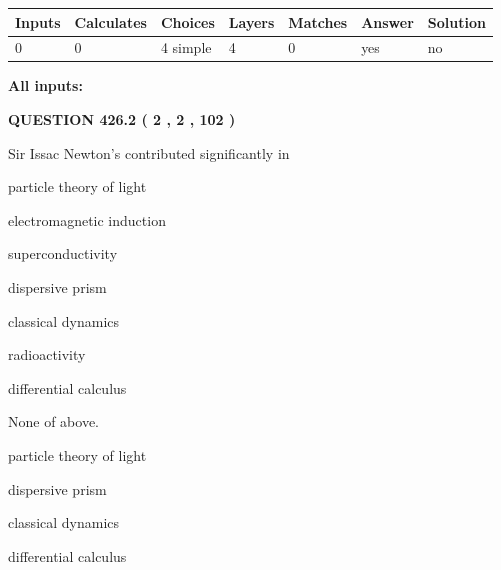 \documentclass[12pt]{article}
\begin{document}
 
   
   
   
   
\noindent\begin{tabular}{|l|l|l|l|l|l|l|}
 \hline
Inputs & Calculates & Choices & Layers & Matches & Answer & Solution \\ \hline
 0  & 
 0  & 
 4
  simple  
  & 
 4  & 
 0  & 
  yes & 
  no 
  \\ \hline
 \end{tabular}
   
   
   
   
\noindent{}
   
   
   
   
\noindent\vspace{0.1in}\hspace{-0.08in} {\textbf{\Large{All inputs: }}}
   
   
  
\vspace{0.2in}
  
{\textbf{\Large{QUESTION
426.2 
 ( 2 , 2 , 102 )
}}}
  
  
Sir Issac Newton's contributed significantly in
 
 
particle theory of light
 
 
electromagnetic induction
 
 
superconductivity
 
 
dispersive prism
 
 
classical dynamics
 
 
radioactivity
 
 
differential calculus
 
 
 None of above.
 
 
\noindent{}
 
 
particle theory of light
 
 
dispersive prism
 
 
classical dynamics
 
 
differential calculus
 
\end{document}
